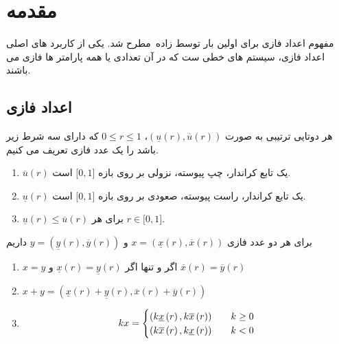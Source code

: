 	\section{مقدمه} 
	مفهوم اعداد فازی برای اولین بار توسط زاده\ \cite{zadeh_2, zadeh_1}مطرح شد. یکی از کاربرد های اصلی اعداد فازی، سیستم های خطی ست که در آن تعدادی یا همه پارامتر ها فازی می باشند.
	\subsection{اعداد فازی}
	هر دوتایی ترتیبی  به صورت $ \left(\underline{u}\left(r\right), \overline{u}\left(r\right)\right) $، $ 0 \leq r \leq 1$ که دارای سه شرط زیر باشد را یک عدد فازی تعریف می کنیم. 
	\begin{enumerate}
		\item $ \overline{u}\left(r\right) $ یک تابع کراندار، چپ پیوسته، نزولی بر روی بازه $ \lbrack0, 1\rbrack $ است.
		\item $ \underline{u}\left(r\right) $ یک تابع کراندار، راست پیوسته، صعودی بر روی بازه $ \lbrack0, 1\rbrack $ است.
		\item $ \underline{u}\left(r\right) \leq \overline{u}\left(r\right) $ برای هر $ r \in \lbrack0, 1\rbrack $.\\
	\end{enumerate}
 برای هر دو عدد فازی $ x = \left(\underline{x}\left(r\right), \overline{x}\left(r\right)\right)$ و
 	$ y = \left(\underline{y}\left(r\right), \overline{y}\left(r\right)\right)$ داریم 
 
 	\begin{enumerate} 
 		\item 
 		$ x = y $ اگر و تنها اگر 
 		$ \underline{x}\left(r\right) = \underline{y}\left(r\right) $ و 
 		$ \overline{x}\left(r\right) = \overline{y}\left(r\right) $ 
 		
 		\item 
 		$ x + y =  
 		\left(\underline{x}\left(r\right) + \underline{y}\left(r\right), 
 		\overline{x}\left(r\right) + \overline{y}\left(r\right)\right)$
 		
 		\item 
 		
 		\[
 		kx = 
 		\begin{cases}
 			\text{$ \left(k\underline{x}\left(r\right), k\overline{x}\left(r\right)\right) $} &\quad\text{$k \geq 0$}\\
			\text{$ \left(k\overline{x}\left(r\right), k\underline{x}\left(r\right)\right) $} &\quad\text{$k < 0$}
 		\end{cases}
 		\]
 		
 	\end{enumerate}
 	
